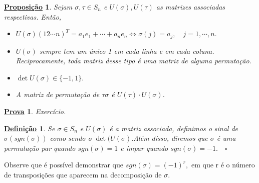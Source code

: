 \documentclass{article}
\newtheorem*{def*}{\underline{Defini\c c\~ao}}
\newtheorem*{prop*}{\underline{Proposi\c c\~ao}}
\newtheorem*{proof*}{\underline{Prova}}
\begin{document}
 \begin{prop*}
   Sejam $\sigma, \tau\in S_{n}$ e $U(\sigma), U(\tau)$ as matrizes associadas respectivas. Ent\~ao,
  \begin{itemize}
    \item[1)] $U(\sigma)(12 \cdots n)^{T} = a_{1}e_{1} + \cdots + a_{n}e_{n} \Longleftrightarrow \sigma(j) = a_{j},\quad j = 1, \cdots, n.$
    \item[2)] $U(\sigma)$ sempre tem um \'unico 1 em cada linha e em cada coluna. Reciprocamente, toda matriz desse tipo
    \'e uma matriz de alguma permuta\c c\~ao.
    \item[3)] $\det{U(\sigma)}\in\{-1, 1\}.$
    \item[4)] A matriz de permuta\c c\~ao de $\tau\sigma$ \'e $U(\tau)\cdot U(\sigma)$.
  \end{itemize}
 \end{prop*}
\begin{proof*}
  Exerc\'icio.
\end{proof*}
\begin{def*}
  Se $\sigma\in S_{n}$ e $U(\sigma)$ \'e a matriz associada, definimos o sinal de $\sigma (sgn(\sigma))$ como sendo o 
$\det{(U(\sigma)}.$Al\'em disso, diremos que $\sigma$ \'e uma permuta\c c\~ao par quando $sgn(\sigma) = 1$ e \'impar quando
 $sgn(\sigma) = -1.\quad\square$ 
\end{def*}
  Observe que \'e poss\'ivel demonstrar que $sgn(\sigma) = (-1)^{r},$ em que r \'e o n\'umero de transposi\c c\~oes que aparecem
na decomposi\c c\~ao de $\sigma.$
\end{document}
